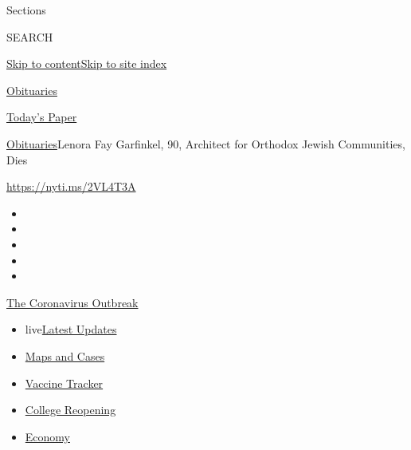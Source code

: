 Sections

SEARCH

\protect\hyperlink{site-content}{Skip to
content}\protect\hyperlink{site-index}{Skip to site index}

\href{https://www.nytimes3xbfgragh.onion/section/obituaries}{Obituaries}

\href{https://myaccount.nytimes3xbfgragh.onion/auth/login?response_type=cookie\&client_id=vi}{}

\href{https://www.nytimes3xbfgragh.onion/section/todayspaper}{Today's
Paper}

\href{/section/obituaries}{Obituaries}\textbar{}Lenora Fay Garfinkel,
90, Architect for Orthodox Jewish Communities, Dies

\url{https://nyti.ms/2VL4T3A}

\begin{itemize}
\item
\item
\item
\item
\item
\end{itemize}

\href{https://www.nytimes3xbfgragh.onion/news-event/coronavirus?action=click\&pgtype=Article\&state=default\&region=TOP_BANNER\&context=storylines_menu}{The
Coronavirus Outbreak}

\begin{itemize}
\tightlist
\item
  live\href{https://www.nytimes3xbfgragh.onion/2020/08/04/world/coronavirus-covid-19.html?action=click\&pgtype=Article\&state=default\&region=TOP_BANNER\&context=storylines_menu}{Latest
  Updates}
\item
  \href{https://www.nytimes3xbfgragh.onion/interactive/2020/us/coronavirus-us-cases.html?action=click\&pgtype=Article\&state=default\&region=TOP_BANNER\&context=storylines_menu}{Maps
  and Cases}
\item
  \href{https://www.nytimes3xbfgragh.onion/interactive/2020/science/coronavirus-vaccine-tracker.html?action=click\&pgtype=Article\&state=default\&region=TOP_BANNER\&context=storylines_menu}{Vaccine
  Tracker}
\item
  \href{https://www.nytimes3xbfgragh.onion/2020/08/02/us/covid-college-reopening.html?action=click\&pgtype=Article\&state=default\&region=TOP_BANNER\&context=storylines_menu}{College
  Reopening}
\item
  \href{https://www.nytimes3xbfgragh.onion/live/2020/08/03/business/stock-market-today-coronavirus?action=click\&pgtype=Article\&state=default\&region=TOP_BANNER\&context=storylines_menu}{Economy}
\end{itemize}

